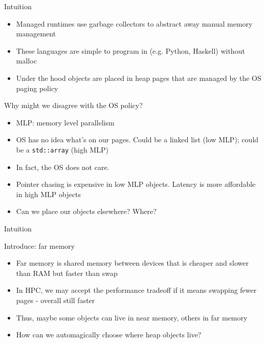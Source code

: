 \begin{frame}{Intuition}
  \begin{itemize}[<+>]
    \item Managed runtimes use garbage collectors to abstract away manual memory management
    \item These languages are simple to program in (e.g. Python, Haskell) without malloc
    \item Under the hood objects are placed in heap pages that are managed by the OS paging policy
  \end{itemize}

  \begin{block}{Why might we disagree with the OS policy?}
    \begin{itemize}[<+>]
      \item MLP: memory level parallelism
      \item OS has no idea what's on our pages. Could be a linked list (low MLP); could be a \texttt{std::array} (high MLP)
      \item In fact, the OS does not care.
      \item Pointer chasing is expensive in low MLP objects. Latency is more affordable in high MLP objects
      \item Can we place our objects elsewhere? Where?
    \end{itemize}
  \end{block}
\end{frame}

\begin{frame}{Intuition}
  \begin{block}{Introduce: far memory}
    \begin{itemize}[<+>]
      \item Far memory is shared memory between devices that is cheaper and slower than RAM but faster than swap
      \item In HPC, we may accept the performance tradeoff if it means swapping fewer pages - overall still faster
      \item Thus, maybe some objects can live in near memory, others in far memory
      \item How can we automagically choose where heap objects live?
    \end{itemize}
  \end{block}
\end{frame}

